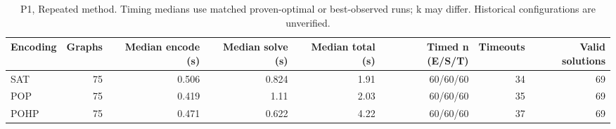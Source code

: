 \begin{table}[htbp]
\centering
\small
\caption{P1, Repeated method. Timing medians use matched proven-optimal or best-observed runs; k may differ. Historical configurations are unverified.}
\label{tab:encoding-runtime}
\begin{tabular}{lrrrrrrr}
\hline
Encoding & Graphs & Median encode (s) & Median solve (s) & Median total (s) & Timed n (E/S/T) & Timeouts & Valid solutions \\
\hline
SAT & 75 & 0.506 & 0.824 & 1.91 & 60/60/60 & 34 & 69 \\
POP & 75 & 0.419 & 1.11 & 2.03 & 60/60/60 & 35 & 69 \\
POHP & 75 & 0.471 & 0.622 & 4.22 & 60/60/60 & 37 & 69 \\
\hline
\end{tabular}
\end{table}
